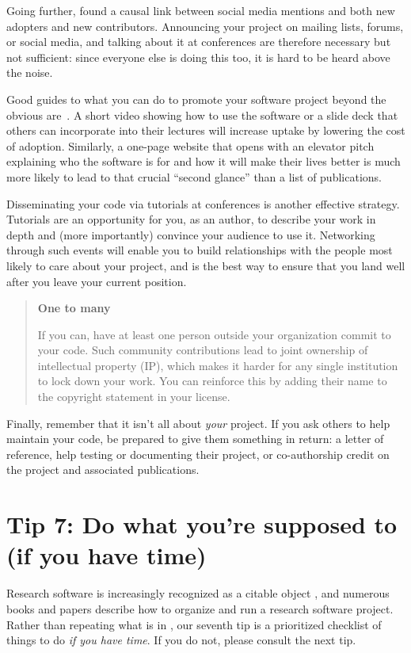 \documentclass[10pt,letterpaper]{article}
\begin{document}
Going further,
\cite{Fang2022} found a causal link between social media mentions and both new adopters and new contributors.
Announcing your project on mailing lists, forums, or social media,
and talking about it at conferences are therefore necessary but not sufficient:
since everyone else is doing this too,
it is hard to be heard above the noise.

Good guides to what you can do to promote your software project beyond the obvious are~\cite{Kuchner2011,BelliniSaibene2024}.
A short video showing how to use the software
or a slide deck that others can incorporate into their lectures
will increase uptake by lowering the cost of adoption.
Similarly,
a one-page website that opens with an elevator pitch
explaining who the software is for
and how it will make their lives better
is much more likely to lead to that crucial ``second glance''
than a list of publications.

Disseminating your code via tutorials at conferences is another effective strategy.
Tutorials are an opportunity for you,
as an author,
to describe your work in depth
and (more importantly) convince your audience to use it.
Networking through such events will enable you to build relationships with
the people most likely to care about your project,
and is the best way to ensure that you land well after you leave your current position.

\begin{quote}
  \noindent
  \textbf{One to many}

  If you can, have at least one person outside your organization commit to your code.
  Such community contributions lead to joint ownership of intellectual property (IP),
  which makes it harder for any single institution to lock down your work.
  You can reinforce this by adding their name to the copyright statement in your license.
\end{quote}

Finally,
remember that it isn't all about \emph{your} project.
If you ask others to help maintain your code,
be prepared to give them something in return:
a letter of reference,
help testing or documenting their project,
or co-authorship credit on the project and associated publications.

\section*{Tip 7: Do what you're supposed to (if you have time)}

Research software is increasingly recognized as a citable object \cite{Smith2016,Katz2021,Garijo2024},
and numerous books and papers describe how to organize and run a research software project.
Rather than repeating what is in
\cite{Sandve2013,Wilson2014,Lee2018a,Dryden2019,Akhmerov2020,Chue2021,Lees2022,Druskat2023,Akhmerov2023,Kumar2023,Struck2023,Reina2024},
our seventh tip is a prioritized checklist of things to do
\emph{if you have time}.
If you do not,
please consult the next tip.
\end{document}
